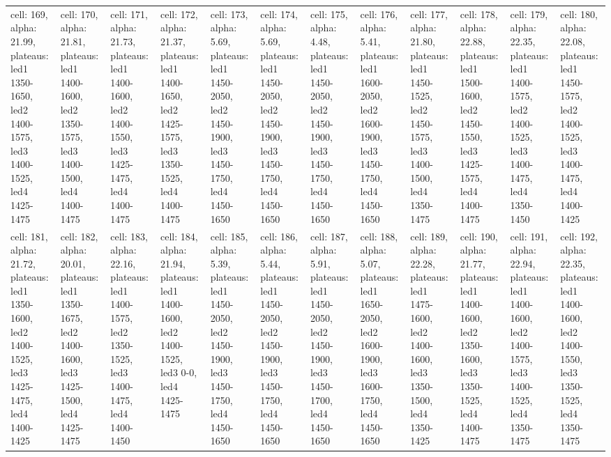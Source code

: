 \begin{landscape}
\begin{longtable}{|l|l|l|l|l|l|l|l|l|l|l|l|}
\rowcolor{lightgray} cell: 169, alpha: 21.99, plateaus: led1 1350-1650, led2 1400-1575, led3 1400-1525, led4 1425-1475 &cell: 170, alpha: 21.81, plateaus: led1 1400-1600, led2 1350-1575, led3 1400-1500, led4 1400-1475 &cell: 171, alpha: 21.73, plateaus: led1 1400-1600, led2 1400-1550, led3 1425-1475, led4 1400-1475 &cell: 172, alpha: 21.37, plateaus: led1 1400-1650, led2 1425-1575, led3 1350-1525, led4 1400-1475 &cell: 173, alpha: 5.69, plateaus: led1 1450-2050, led2 1450-1900, led3 1450-1750, led4 1450-1650 &cell: 174, alpha: 5.69, plateaus: led1 1450-2050, led2 1450-1900, led3 1450-1750, led4 1450-1650 &cell: 175, alpha: 4.48, plateaus: led1 1450-2050, led2 1450-1900, led3 1450-1750, led4 1450-1650 &cell: 176, alpha: 5.41, plateaus: led1 1600-2050, led2 1600-1900, led3 1450-1750, led4 1450-1650 &cell: 177, alpha: 21.80, plateaus: led1 1450-1525, led2 1450-1575, led3 1400-1500, led4 1350-1475 &cell: 178, alpha: 22.88, plateaus: led1 1500-1600, led2 1450-1550, led3 1425-1575, led4 1400-1475 &cell: 179, alpha: 22.35, plateaus: led1 1400-1575, led2 1400-1525, led3 1400-1475, led4 1350-1450 &cell: 180, alpha: 22.08, plateaus: led1 1450-1575, led2 1400-1525, led3 1400-1475, led4 1400-1425 \\
cell: 181, alpha: 21.72, plateaus: led1 1350-1600, led2 1400-1525, led3 1425-1475, led4 1400-1425 &cell: 182, alpha: 20.01, plateaus: led1 1350-1675, led2 1400-1600, led3 1425-1500, led4 1425-1475 &cell: 183, alpha: 22.16, plateaus: led1 1400-1575, led2 1350-1525, led3 1400-1475, led4 1400-1450 &cell: 184, alpha: 21.94, plateaus: led1 1400-1600, led2 1400-1525, led3 0-0, led4 1425-1475 &cell: 185, alpha: 5.39, plateaus: led1 1450-2050, led2 1450-1900, led3 1450-1750, led4 1450-1650 &cell: 186, alpha: 5.44, plateaus: led1 1450-2050, led2 1450-1900, led3 1450-1750, led4 1450-1650 &cell: 187, alpha: 5.91, plateaus: led1 1450-2050, led2 1450-1900, led3 1450-1700, led4 1450-1650 &cell: 188, alpha: 5.07, plateaus: led1 1650-2050, led2 1600-1900, led3 1600-1750, led4 1450-1650 &cell: 189, alpha: 22.28, plateaus: led1 1475-1600, led2 1400-1600, led3 1350-1500, led4 1350-1425 &cell: 190, alpha: 21.77, plateaus: led1 1400-1600, led2 1350-1600, led3 1350-1525, led4 1400-1475 &cell: 191, alpha: 22.94, plateaus: led1 1400-1600, led2 1400-1575, led3 1400-1525, led4 1350-1475 &cell: 192, alpha: 22.35, plateaus: led1 1400-1600, led2 1400-1550, led3 1350-1525, led4 1350-1475 \\

\end{longtable}
\end{landscape}
